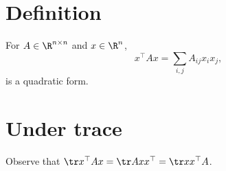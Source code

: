
\section*{Definition}

For $A \in \R ^{n \times n}$ and $x \in \R ^n$,
  \[
x^\top  A x = \sum_{i,j} A_{ij}x_{i}x_{j},
  \]
is a quadratic form.

\section*{Under trace}

Observe that $\tr x^\top  A x = \tr A x x^\top  = \tr xx^\top A$.

\blankpage